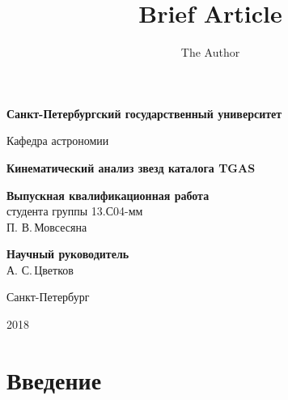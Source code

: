 \documentclass[14pt]{article} %
\title{Brief Article}
\author{The Author}
\begin{document}
\begin{titlepage}

\begin{center}
{\small \bf Санкт-Петербургский государственный университет

Кафедра астрономии}
\end{center}

\vspace{2cm}
\begin{center}
  \large{\bf Кинематический анализ звезд каталога TGAS}
 \end{center}

\vspace{3cm}

\hspace{8cm}\parbox{8cm}{	%

\footnotesize{{\bf Выпускная квалификационная работа}\\
студента группы 13.С04-мм\\
П. В.\,Мовсесяна}  %

\vspace{1cm}

{\bf Научный руководитель}\\
А. С.\,Цветков \\  %
}


\vfill %

\begin{center}
\small {Санкт-Петербург

2018}
\end{center}

\end{titlepage}

\tableofcontents
\newpage

\section{Введение}
\end{document}
